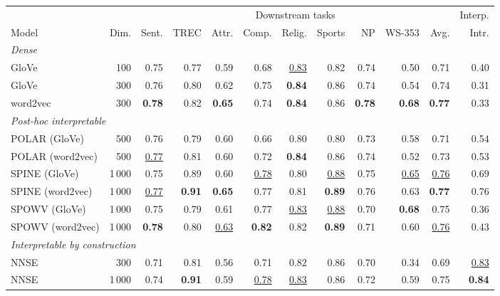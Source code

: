 \begin{table}[t]
  \centering
  \small
  \setlength{\tabcolsep}{4.5pt}
  \begin{tabular}{lrrrrrrrrrrr}
    \toprule
     &  & \multicolumn{9}{c}{Downstream tasks} & \multicolumn{1}{c}{Interp.} \\
    \cmidrule(lr){3-11} \cmidrule(lr){12-12}
    Model & Dim. & Sent. & TREC & Attr. & Comp. & Relig. & Sports & NP & WS-353 & Avg. & Intr. \\
    \midrule
    \multicolumn{12}{l}{\textit{Dense}} \\
    GloVe & 100 & 0.75 & 0.77 & 0.59 & 0.68 & \underline{0.83} & 0.82 & 0.74 & 0.50 & 0.71 & 0.40 \\
    GloVe & 300 & 0.76 & 0.80 & 0.62 & 0.75 & \textbf{0.84} & 0.86 & 0.74 & 0.54 & 0.74 & 0.31 \\
    word2vec & 300 & \textbf{0.78} & 0.82 & \textbf{0.65} & 0.74 & \textbf{0.84} & 0.86 & \textbf{0.78} & \textbf{0.68} & \textbf{0.77} & 0.33 \\
    \midrule
    \multicolumn{12}{l}{\textit{Post-hoc interpretable}} \\
    POLAR (GloVe) & 500 & 0.76 & 0.79 & 0.60 & 0.66 & 0.80 & 0.80 & 0.73 & 0.58 & 0.71 & 0.54 \\
    POLAR (word2vec) & 500 & \underline{0.77} & 0.81 & 0.60 & 0.72 & \textbf{0.84} & 0.86 & 0.74 & 0.52 & 0.73 & 0.53 \\
    SPINE (GloVe) & 1\,000 & 0.75 & 0.89 & 0.60 & \underline{0.78} & 0.80 & \underline{0.88} & 0.75 & \underline{0.65} & \underline{0.76} & 0.69 \\
    SPINE (word2vec) & 1\,000 & \underline{0.77} & \textbf{0.91} & \textbf{0.65} & 0.77 & 0.81 & \textbf{0.89} & 0.76 & 0.63 & \textbf{0.77} & 0.76 \\
    SPOWV (GloVe) & 1\,000 & 0.75 & 0.79 & 0.61 & 0.77 & \underline{0.83} & \underline{0.88} & 0.70 & \textbf{0.68} & 0.75 & 0.36 \\
    SPOWV (word2vec) & 1\,000 & \textbf{0.78} & 0.80 & \underline{0.63} & \textbf{0.82} & 0.82 & \textbf{0.89} & 0.71 & 0.60 & \underline{0.76} & 0.43 \\
    \midrule
    \multicolumn{12}{l}{\textit{Interpretable by construction}} \\
    NNSE & 300 & 0.71 & 0.81 & 0.56 & 0.71 & 0.82 & 0.86 & 0.70 & 0.34 & 0.69 & \underline{0.83} \\
    NNSE & 1\,000 & 0.74 & \textbf{0.91} & 0.59 & \underline{0.78} & \underline{0.83} & 0.86 & 0.72 & 0.59 & 0.75 & \textbf{0.84} \\

\end{tabular}
\end{table}
